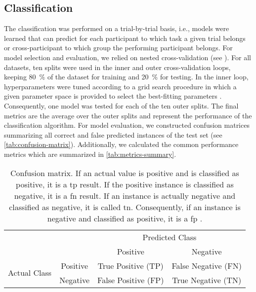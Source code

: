 \subsection{Classification}
The classification was performed on a trial-by-trial basis, i.e., models were learned that can predict for each participant to which task a given trial belongs or cross-participant to which group the performing participant belongs. For model selection and evaluation, we relied on nested cross-validation (see ). For all datasets, ten splits were used in the inner and outer cross-validation loops, keeping 80~\% of the dataset for training and 20~\% for testing. In the inner loop, hyperparameters were tuned according to a grid search procedure in which a given parameter space is provided to select the best-fitting parameters \cite{Varoquaux2017}. Consequently, one model was tested for each of the ten outer splits. The final metrics are the average over the outer splits and represent the performance of the classification algorithm. For model evaluation, we constructed confusion matrices summarizing all correct and false predicted instances of the test set \cite{Fawcett2006} (see \autoref{tab:confusion-matrix}). Additionally, we calculated the common performance metrics which are summarized in \autoref{tab:metrics-summary}.

\begin{table}[ht]
    \captionsetup{justification=justified, singlelinecheck=false}
    \caption[Confusion matrix]{Confusion matrix. If an actual value is positive and is classified as positive, it is a \gls{tp} result. If the positive instance is classified as negative, it is a \gls{fn} result. If an instance is actually negative and classified as negative, it is called \gls{tn}. Consequently, if an instance is negative and classified as positive, it is a \gls{fp} \cite{Fawcett2006}.}
    \label{tab:confusion-matrix}
    \renewcommand{\arraystretch}{1.25}
    \centering
        \begin{tabular}{cc|c|c|}
            \cline{3-4}
            & & \multicolumn{2}{c|}{Predicted Class} \\ \cline{3-4} 
            & & Positive & Negative \\ \hline
            \multicolumn{1}{|c|}{\multirow{2}{*}{Actual Class}} & Positive & True Positive (TP) & False Negative (FN) \\ \cline{2-4} 
            \multicolumn{1}{|c|}{} & Negative & False Positive (FP) & True Negative (TN) \\ \hline
        \end{tabular}
\end{table}

